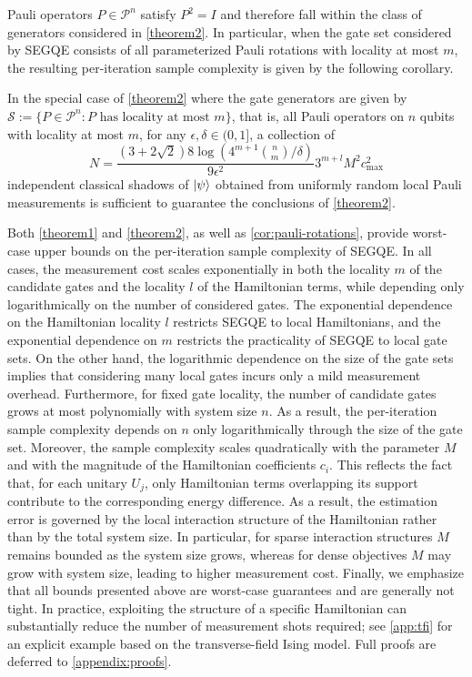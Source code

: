 Pauli operators $P\in\mathcal{P}^n$ satisfy $P^2=I$ and therefore fall within the class of generators considered in \cref{theorem2}. In particular, when the
gate set considered by SEGQE consists of all parameterized Pauli rotations with locality at most $m$, the resulting per-iteration sample complexity is given by the following corollary.
\begin{corollary}
    \label{cor:pauli-rotations}
    In the special case of \cref{theorem2} where the gate generators are given by
    $\mathcal{S}:= \{P\in \mathcal{P}^n:\text{$P$ has locality at most $m$}\}$, that is, all Pauli operators on $n$ qubits with locality at most $m$,
    for any $\epsilon, \delta \in (0,1]$, a collection of 
    \begin{equation}
        N =\frac{\left(3+2\sqrt{2}\right)8\log\left(4^{m+1}\binom{n}{m}/\delta\right)}{9\epsilon^2}3^{m+l}M^2c_\mathrm{max}^2
    \end{equation}
    independent classical shadows of $\ket{\psi}$ obtained from uniformly random local Pauli measurements is sufficient to guarantee the conclusions of \cref{theorem2}.
\end{corollary}
Both \cref{theorem1} and \cref{theorem2}, as well as \cref{cor:pauli-rotations}, provide worst-case upper bounds on the per-iteration sample complexity of SEGQE. In all cases, the measurement cost scales exponentially in both the locality $m$ of the candidate gates and the locality $l$ of the Hamiltonian terms, while depending only logarithmically on the number of considered gates. The exponential dependence on the Hamiltonian locality $l$ restricts SEGQE to local Hamiltonians, and the exponential dependence on $m$ restricts the practicality of SEGQE to local gate sets. On the other hand, the logarithmic dependence on the size of the gate sets implies that considering many local gates incurs only a mild measurement overhead. Furthermore, for fixed gate locality, the number of candidate gates grows at most polynomially with system size $n$. As a result, the per-iteration sample complexity depends on $n$ only logarithmically through the size of the gate set. Moreover, the sample complexity scales quadratically with the parameter $M$ and with the magnitude of the Hamiltonian coefficients $c_i$. This reflects the fact that, for each unitary $U_j$, 
only Hamiltonian terms overlapping its support contribute to the corresponding 
energy difference. As a result, the estimation error is governed by the local interaction structure of the Hamiltonian rather than by the total system size. In particular, for sparse interaction structures $M$ remains bounded as the system size grows, whereas for dense objectives $M$ may grow with system size, leading to higher measurement cost.
Finally, we emphasize that all bounds presented above are worst-case guarantees and are generally not tight. In practice, exploiting the structure of a specific Hamiltonian can substantially reduce the number of measurement shots required; see \cref{app:tfi} for an explicit example based on the transverse-field Ising model. Full proofs are deferred to \cref{appendix:proofs}. 
